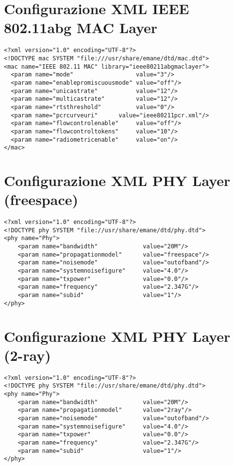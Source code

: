 \section{Configurazione XML IEEE 802.11abg MAC Layer}
\label{app:80211}

\lstset{language=XML}
\begin{lstlisting}
<?xml version="1.0" encoding="UTF-8"?>
<!DOCTYPE mac SYSTEM "file:///usr/share/emane/dtd/mac.dtd">
<mac name="IEEE 802.11 MAC" library="ieee80211abgmaclayer">
  <param name="mode"                  value="3"/>
  <param name="enablepromiscuousmode" value="off"/>
  <param name="unicastrate"           value="12"/>
  <param name="multicastrate"         value="12"/>
  <param name="rtsthreshold"          value="0"/>
  <param name="pcrcurveuri"      value="ieee80211pcr.xml"/>
  <param name="flowcontrolenable"     value="off"/>
  <param name="flowcontroltokens"     value="10"/>
  <param name="radiometricenable"     value="on"/>
</mac>
\end{lstlisting}

\section{Configurazione XML PHY Layer (freespace)}
\label{app:freespace}

\lstset{language=XML}
\begin{lstlisting}
<?xml version="1.0" encoding="UTF-8"?>
<!DOCTYPE phy SYSTEM "file://usr/share/emane/dtd/phy.dtd">
<phy name="Phy">
    <param name="bandwidth"             value="20M"/>
    <param name="propagationmodel"      value="freespace"/>
    <param name="noisemode"             value="outofband"/>
    <param name="systemnoisefigure"     value="4.0"/>
    <param name="txpower"               value="0.0"/>
    <param name="frequency"             value="2.347G"/>
    <param name="subid"                 value="1"/>
</phy>
\end{lstlisting}

\section{Configurazione XML PHY Layer (2-ray)}
\label{app:2-ray}

\lstset{language=XML}
\begin{lstlisting}
<?xml version="1.0" encoding="UTF-8"?>
<!DOCTYPE phy SYSTEM "file://usr/share/emane/dtd/phy.dtd">
<phy name="Phy">
    <param name="bandwidth"             value="20M"/>
    <param name="propagationmodel"      value="2ray"/>
    <param name="noisemode"             value="outofband"/>
    <param name="systemnoisefigure"     value="4.0"/>
    <param name="txpower"               value="0.0"/>
    <param name="frequency"             value="2.347G"/>
    <param name="subid"                 value="1"/>
</phy>
\end{lstlisting}


